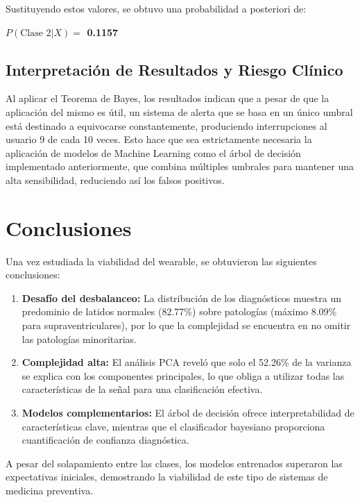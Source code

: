 \documentclass[a4paper,twocolumn]{article}
\begin{document}
	Sustituyendo estos valores, se obtuvo una probabilidad a posteriori de:
	\begin{center}
		\textbf{$P(\text{Clase 2} | X) = $ 0.1157}
	\end{center}

	\subsection{Interpretación de Resultados y Riesgo Clínico}
	
	Al aplicar el Teorema de Bayes, los resultados indican que a pesar de que la aplicación del mismo es útil, un sistema de alerta que se basa en un
	único umbral está destinado a equivocarse constantemente, produciendo interrupciones al usuario 9 de cada 10 veces. Esto hace que sea estrictamente
	necesaria la aplicación de modelos de Machine Learning como el árbol de decisión implementado anteriormente, que combina múltiples umbrales
	para mantener una alta sensibilidad, reduciendo así los falsos positivos.

	\section{Conclusiones}
	\label{sec:conclusiones}

	Una vez estudiada la viabilidad del wearable, se obtuvieron las siguientes conclusiones:

	\begin{enumerate}
		\item \textbf{Desafío del desbalanceo:} La distribución de los diagnósticos muestra un predominio de latidos normales (82.77\%) sobre patologías (máximo 8.09\% para supraventriculares), por lo que la complejidad se encuentra en no omitir las patologías minoritarias.
		
		\item \textbf{Complejidad alta:} El análisis PCA reveló que solo el 52.26\% de la varianza se explica con los componentes principales, lo que obliga a utilizar todas las características de la señal para una clasificación efectiva.
				
		\item \textbf{Modelos complementarios:} El árbol de decisión ofrece interpretabilidad de características clave, mientras que el clasificador bayesiano proporciona cuantificación de confianza diagnóstica.
	\end{enumerate}

	A pesar del solapamiento entre las clases, los modelos entrenados superaron las expectativas iniciales, demostrando la viabilidad de este tipo de sistemas de medicina preventiva.
	
	
\end{document}
